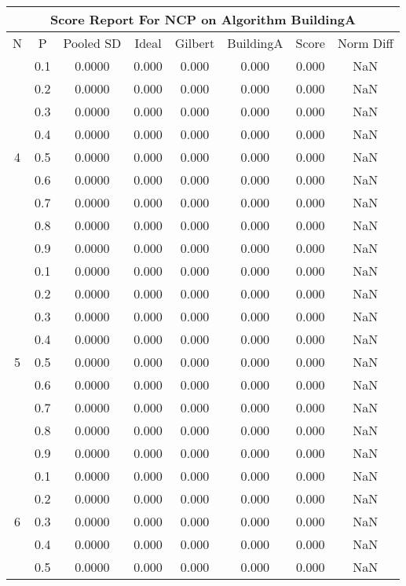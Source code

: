 \documentclass[11pt,a4paper]{report}
\begin{document}
\begin{longtable}{ | c | c || c | c | c | c | c | c | }
\hline
\multicolumn{8}{|c|}{ Score Report For NCP on Algorithm BuildingA} \\
\hline
N & P & Pooled SD &  Ideal &  Gilbert & BuildingA  & Score & Norm Diff \\
 \hline
 \hline
 \endhead
\multirow{9}{*}{4} & 0.1 & 0.0000 & 0.000 & 0.000 & 0.000 & 0.000 & NaN \\
 & 0.2 & 0.0000 & 0.000 & 0.000 & 0.000 & 0.000 & NaN \\
 & 0.3 & 0.0000 & 0.000 & 0.000 & 0.000 & 0.000 & NaN \\
 & 0.4 & 0.0000 & 0.000 & 0.000 & 0.000 & 0.000 & NaN \\
 & 0.5 & 0.0000 & 0.000 & 0.000 & 0.000 & 0.000 & NaN \\
 & 0.6 & 0.0000 & 0.000 & 0.000 & 0.000 & 0.000 & NaN \\
 & 0.7 & 0.0000 & 0.000 & 0.000 & 0.000 & 0.000 & NaN \\
 & 0.8 & 0.0000 & 0.000 & 0.000 & 0.000 & 0.000 & NaN \\
 & 0.9 & 0.0000 & 0.000 & 0.000 & 0.000 & 0.000 & NaN \\
 \hline
\multirow{9}{*}{5} & 0.1 & 0.0000 & 0.000 & 0.000 & 0.000 & 0.000 & NaN \\
 & 0.2 & 0.0000 & 0.000 & 0.000 & 0.000 & 0.000 & NaN \\
 & 0.3 & 0.0000 & 0.000 & 0.000 & 0.000 & 0.000 & NaN \\
 & 0.4 & 0.0000 & 0.000 & 0.000 & 0.000 & 0.000 & NaN \\
 & 0.5 & 0.0000 & 0.000 & 0.000 & 0.000 & 0.000 & NaN \\
 & 0.6 & 0.0000 & 0.000 & 0.000 & 0.000 & 0.000 & NaN \\
 & 0.7 & 0.0000 & 0.000 & 0.000 & 0.000 & 0.000 & NaN \\
 & 0.8 & 0.0000 & 0.000 & 0.000 & 0.000 & 0.000 & NaN \\
 & 0.9 & 0.0000 & 0.000 & 0.000 & 0.000 & 0.000 & NaN \\
 \hline
\multirow{9}{*}{6} & 0.1 & 0.0000 & 0.000 & 0.000 & 0.000 & 0.000 & NaN \\
 & 0.2 & 0.0000 & 0.000 & 0.000 & 0.000 & 0.000 & NaN \\
 & 0.3 & 0.0000 & 0.000 & 0.000 & 0.000 & 0.000 & NaN \\
 & 0.4 & 0.0000 & 0.000 & 0.000 & 0.000 & 0.000 & NaN \\
 & 0.5 & 0.0000 & 0.000 & 0.000 & 0.000 & 0.000 & NaN \\

\end{longtable}
\end{document}
